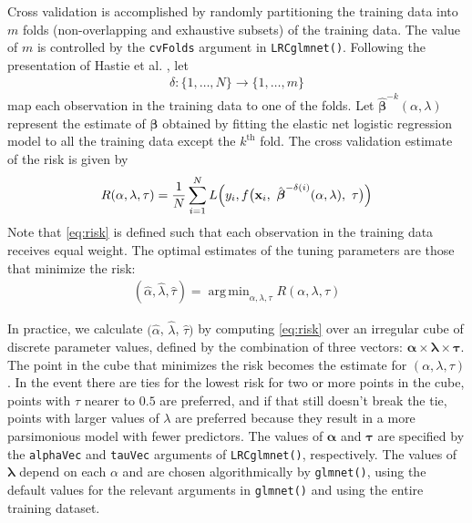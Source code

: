 \documentclass{article}
\DeclareMathOperator*{\argmin}{arg\,min}
\begin{document}
Cross validation is accomplished by randomly partitioning the training data into $m$ folds (non-overlapping and
exhaustive subsets) of the training data. The value of $m$ is controlled by the {\tt cvFolds} argument in 
{\tt LRCglmnet()}. Following the presentation of Hastie et al. \cite{Hastie}, let
\begin{align}
\label{eq:cv_map}
\delta:\{1,\ldots,N\} \rightarrow \{1, \ldots, m\}
\end{align}
\noindent map each observation in the training data to one of the folds.
Let $\hat{\boldsymbol{\beta}}^{-k}(\alpha,\lambda)$ represent the estimate of $\boldsymbol\beta$ obtained by
fitting the elastic net logistic regression model to all the training data except the $k^{\text{th}}$ fold.
The cross validation estimate of the risk is given by
\begin{align}
\label{eq:risk}
R(\alpha,\lambda,\tau) = \frac{1}{N}\sum_{i=1}^N L \Bigl(y_i, f\bigl(\mathbf{x}_i,
~\hat{\boldsymbol{\beta}}^{-\delta(i)}(\alpha,\lambda), ~\tau \bigr) \Bigr)
\end{align}
\noindent Note that \eqref{eq:risk} is defined such that each observation in the training data receives 
equal weight. The optimal estimates of the tuning parameters are those that minimize the risk:
\begin{align}
(\hat\alpha,\hat\lambda,\hat\tau) = \argmin_{\alpha,\lambda,\tau} R(\alpha,\lambda,\tau)
\end{align}

In practice, we calculate $(\hat\alpha$, $\hat\lambda$, $\hat\tau)$ by computing \eqref{eq:risk} over an irregular
cube of discrete parameter values, defined by the combination of three vectors:  
$\boldsymbol\alpha \times \boldsymbol\lambda \times \boldsymbol\tau$.
The point in the cube that minimizes the risk becomes the estimate for $(\alpha, \lambda, \tau)$. In the event there
are ties for the lowest risk for two or more points in the cube, points with $\tau$ nearer to $0.5$ are preferred, and
if that still doesn't break the tie, points with larger values of $\lambda$ are preferred because they result in
a more parsimonious model with fewer predictors.
The values of $\boldsymbol\alpha$ and $\boldsymbol\tau$ are specified by the {\tt alphaVec} and {\tt tauVec} arguments
of {\tt LRCglmnet()}, respectively.  The values of $\boldsymbol\lambda$ depend on each $\alpha$ and are chosen algorithmically
by {\tt glmnet()}, using the default values for the relevant arguments in {\tt glmnet()} and using the entire training dataset.
\end{document}
